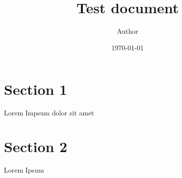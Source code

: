 \documentclass[11pt]{article}
\title{ Test document}
\author{ Author }
\date{\today}
\begin{document}
\maketitle
\pagebreak

\tableofcontents
\pagebreak


\section{Section 1}

Lorem Impsum dolor sit amet

\pagebreak
\section{Section 2}
Lorem Ipsum \\

\end{document}
